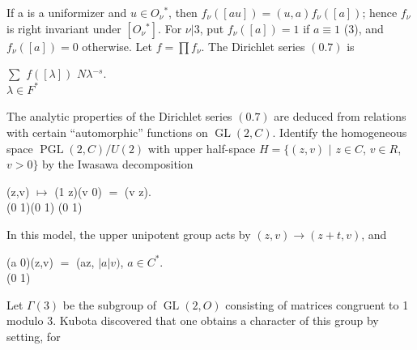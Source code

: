 \documentclass[10pt,a4paper]{article}
\begin{document}
\par If a is a uniformizer and $u\in{}O_\nu{}^*$, then $f_\nu{}([au])=(u,a)f_\nu{}([a])$; hence $f_\nu{}$ is right invariant under $[O_\nu{}^*]$. For $\nu{}|3$, put $f_\nu{}([a])=1$ if $a\equiv{}1$ (3), and $f_\nu{}([a])=0$ otherwise. Let $f=\prod{}f_\nu{}$. The Dirichlet series $(0.7)$ is\par
\par\smallskip\begin{center}\begin{minipage}{0.96\textwidth}\centering
$\sum{}$ $f([\lambda{}])$ $N\lambda{}^{-s}$. \\ $\lambda{}\in{}F^*$
\end{minipage}\end{center}\smallskip
\par The analytic properties of the Dirichlet series $(0.7)$ are deduced from relations with certain ``automorphic'' functions on $\operatorname{GL}(2,C)$. Identify the homogeneous space $\operatorname{PGL}(2,C)/U(2)$ with upper half-space $H=\{(z,v)$ $|$ $z\in{}C$, $v\in{}R$, $v>0\}$ by the Iwasawa decomposition\par
\par\smallskip\begin{center}\begin{minipage}{0.96\textwidth}\centering
(z,v) $\mapsto{}$ (1 z)(v 0) $=$ (v z). \\ (0 1)(0 1) (0 1)
\end{minipage}\end{center}\smallskip
\par In this model, the upper unipotent group acts by $(z,v)\to{}(z+t,v)$, and\par
\par\smallskip\begin{center}\begin{minipage}{0.96\textwidth}\centering
(a 0)(z,v) $=$ (az, $|a|v)$, $a\in{}C^*$. \\ (0 1)
\end{minipage}\end{center}\smallskip
\par Let $\Gamma{}(3)$ be the subgroup of $\operatorname{GL}(2,O)$ consisting of matrices congruent to 1 modulo 3. Kubota discovered that one obtains a character of this group by setting, for\par
\end{document}
